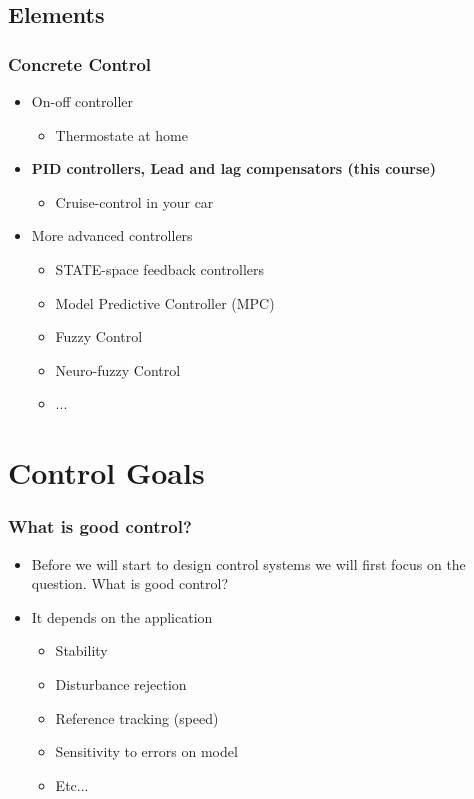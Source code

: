 \subsection[Elements]{Elements}
\begin{frame}
	\frametitle{Concrete Control}
	\begin{itemize}
		\item On-off controller
		\begin{itemize}
			\item Thermostate at home
		\end{itemize}
		\item \textbf{PID controllers, Lead and lag compensators (this course)}
		\begin{itemize}
			\item Cruise-control in your car
		\end{itemize}
		\item More advanced controllers
		\begin{itemize}
			\item STATE-space feedback controllers
			\item Model Predictive Controller (MPC)
			\item Fuzzy Control
			\item Neuro-fuzzy Control
			\item ...
		\end{itemize}
	\end{itemize}
\end{frame}


\section{Control Goals}
\begin{frame}
	\frametitle{What is good control?}
	\begin{itemize}
		\item Before we will start to design control systems we will first focus on the question. What is good control?
		\item It depends on the application
		\begin{itemize}
			\item Stability
			\item Disturbance rejection
			\item Reference tracking (speed)
			\item Sensitivity to errors on model
			\item Etc...
		\end{itemize}
	\end{itemize}
\end{frame}


